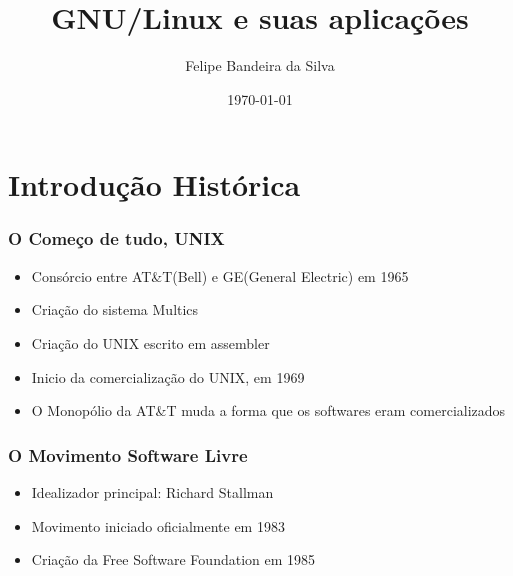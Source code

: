 \documentclass{beamer}
\title[GNU/Linux]{GNU/Linux e suas aplicações} %
\author{Felipe Bandeira da Silva} %
\institute[Unifor] %
{
Universidade de Fortaleza-UNIFOR\\Universidade de Federal do Ceará-UFC\\ %
\medskip
\textit{felipeband18@gmail.com} %
}
\date{\today} %
\begin{document}
\begin{frame}
\titlepage %
\end{frame}



\section{Introdução Histórica} %

\begin{frame}
    \frametitle{O Começo de tudo, UNIX}

    \begin{itemize}
        \item Consórcio entre AT\&T(Bell) e GE(General Electric) em 1965
        \item Criação do sistema Multics
        \item Criação do UNIX escrito em assembler
        \item Inicio da comercialização do UNIX, em 1969
        \item O Monopólio da AT\&T muda a forma que os softwares eram comercializados
    \end{itemize}
\end{frame}

\begin{frame}
\frametitle{O Movimento Software Livre}
\begin{itemize}
    \item Idealizador principal: Richard Stallman
    \item Movimento iniciado oficialmente em 1983
    \item Criação da Free Software Foundation em 1985
\end{itemize}
\end{frame}
\end{document}
